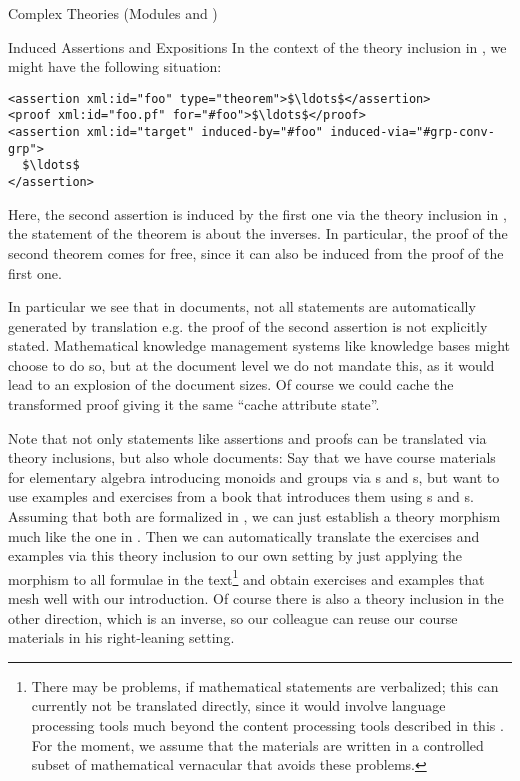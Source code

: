 \begin{tchapter}[id=complex-theories,short=Complex Theories]{Complex Theories (Modules
     and )}
\begin{tsection}[id=induced-assertions,short=Induced Assertions]{Induced Assertions and Expositions}
  In the context of the theory inclusion in , we
  might have the following situation:
\begin{lstlisting}[label=lst:assertion-translation,mathescape,
  caption={Translating a Statement via a Theory Inclusion},
  index={translated-from,translated-via}]
<assertion xml:id="foo" type="theorem">$\ldots$</assertion>
<proof xml:id="foo.pf" for="#foo">$\ldots$</proof>
<assertion xml:id="target" induced-by="#foo" induced-via="#grp-conv-grp"> 
  $\ldots$
</assertion>
\end{lstlisting}
Here, the second assertion is induced by the first one via the theory inclusion in
, the statement of the theorem is about the inverses.  In
particular, the proof of the second theorem comes for free, since it can also be induced
from the proof of the first one.

In particular we see that in \omdoc documents, not all statements are automatically
generated by translation e.g. the proof of the second assertion is not explicitly stated.
Mathematical knowledge management systems like knowledge bases might choose to do so, but
at the document level we do not mandate this, as it would lead to an explosion of the
document sizes. Of course we could cache the transformed proof giving it the same ``cache
attribute state''.

Note that not only statements like assertions and proofs can be translated via theory
inclusions, but also whole documents: Say that we have course materials for elementary
algebra introducing monoids and groups via s and
s, but want to use examples and exercises from a book that
introduces them using s and s. Assuming
that both are formalized in \omdoc, we can just establish a theory morphism much like
the one in . Then we can automatically translate the
exercises and examples via this theory inclusion to our own setting by just applying the
morphism to all formulae in the text\footnote{There may be problems, if mathematical
  statements are verbalized; this can currently not be translated directly, since it would
  involve language processing tools much beyond the content processing tools described in
  this {\report}. For the moment, we assume that the materials are written in a controlled
  subset of mathematical vernacular that avoids these problems.}  and obtain exercises and
examples that mesh well with our introduction. Of course there is also a theory inclusion
in the other direction, which is an inverse, so our colleague can reuse our course
materials in his right-leaning setting.


\end{tsection}
\end{tchapter}
